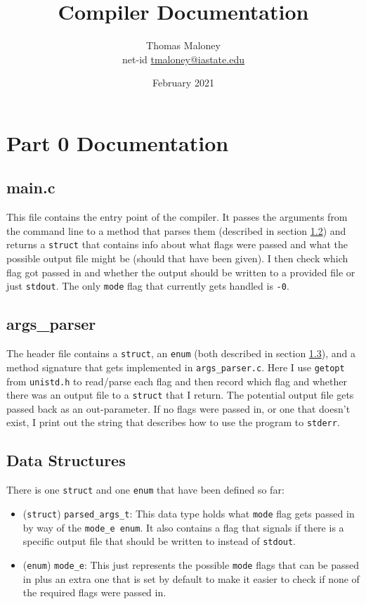 \documentclass{article}
\title{Compiler Documentation}
\author{Thomas Maloney \\ 
net-id \href{mailto:tmaloney@iastate.edu}{tmaloney@iastate.edu}}
\date{February 2021}
\begin{document}
\maketitle

\newcommand{\code}[1]{\texttt{#1}}

\section{Part 0 Documentation}
\subsection{main.c} 
\label{ssec:p0main}
This file contains the entry point of the compiler.
It passes the arguments from the command line to a method that parses them (described in section \ref{ssec:p0argparser}) and returns a \code{struct} that contains info about what flags were passed and what the possible output file might be (should that have been given).
I then check which flag got passed in and whether the output should be written to a provided file or just \code{stdout}.
The only \code{mode} flag that currently gets handled is \code{-0}.

\subsection{args\_parser} 
\label{ssec:p0argparser}
The header file contains a \code{struct}, an \code{enum} (both described in section \ref{ssec:p0datastructs}), and a method signature that gets implemented in \code{args\_parser.c}.
Here I use \code{getopt} from \code{unistd.h} to read/parse each flag and then record which flag and whether there was an output file to a \code{struct} that I return.
The potential output file gets passed back as an out-parameter.
If no flags were passed in, or one that doesn't exist, I print out the string that describes how to use the program to \code{stderr}.

\subsection{Data Structures} 
\label{ssec:p0datastructs}
There is one \code{struct} and one \code{enum} that have been defined so far:
\begin{itemize}
    \item (\code{struct}) \code{parsed\_args\_t}: This data type holds what \code{mode} flag gets passed in by way of the \code{mode\_e enum}.
    It also contains a flag that signals if there is a specific output file that should be written to instead of \code{stdout}.
    \item (\code{enum}) \code{mode\_e}: This just represents the possible \code{mode} flags that can be passed in plus an extra one that is set by default to make it easier to check if none of the required flags were passed in.
\end{itemize}
\end{document}
